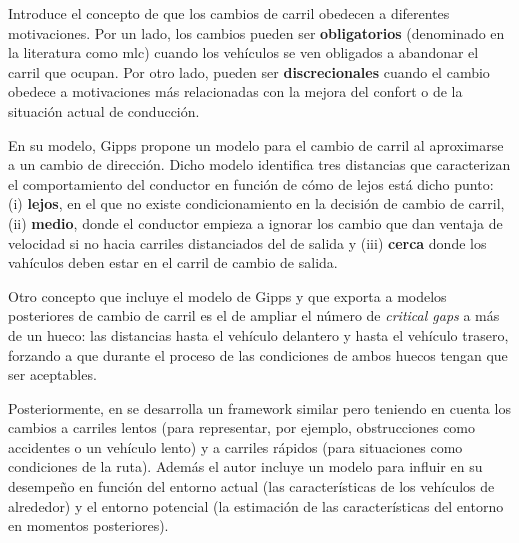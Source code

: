 Introduce el concepto de que los cambios de carril obedecen a diferentes motivaciones. Por un lado, los cambios pueden ser \textbf{obligatorios} (denominado en la literatura como \gls{mlc}) cuando los vehículos se ven obligados a abandonar el carril que ocupan. Por otro lado, pueden ser \textbf{discrecionales} cuando el cambio obedece a motivaciones más relacionadas con la mejora del confort o de la situación actual de conducción.

En su modelo, Gipps propone un modelo para el cambio de carril al aproximarse a un cambio de dirección. Dicho modelo identifica tres distancias que caracterizan el comportamiento del conductor en función de cómo de lejos está dicho punto: (i) \textbf{lejos}, en el que no existe condicionamiento en la decisión de cambio de carril, (ii) \textbf{medio}, donde el conductor empieza a ignorar los cambio que dan ventaja de velocidad si no hacia carriles distanciados del de salida y (iii) \textbf{cerca} donde los vahículos deben estar en el carril de cambio de salida.

Otro concepto que incluye el modelo de Gipps y que exporta a modelos posteriores de cambio de carril es el de ampliar el número de \textit{critical gaps} a más de un hueco: las distancias hasta el vehículo delantero y hasta el vehículo trasero, forzando a que durante el proceso de \textit{} las condiciones de ambos huecos tengan que ser aceptables.

Posteriormente, en \cite{wiedemann1992microscopic} se desarrolla un framework similar pero teniendo en cuenta los cambios a carriles lentos (para representar, por ejemplo, obstrucciones como accidentes o un vehículo lento) y a carriles rápidos (para situaciones como condiciones de la ruta). Además el autor incluye un modelo para influir en su desempeño en función del entorno actual (las características de los vehículos de alrededor) y el entorno potencial (la estimación de las características del entorno en momentos posteriores).


